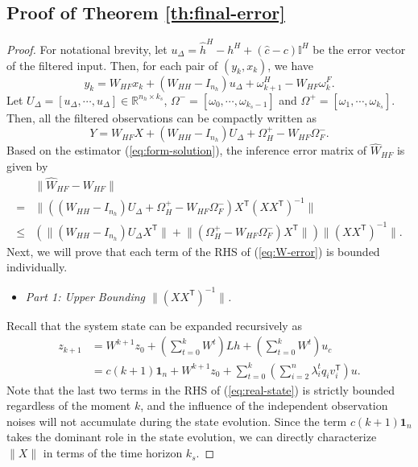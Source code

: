 \documentclass[12pt,journal,draftclsnofoot,onecolumn]{IEEEtran}
\let \sss=\scriptscriptstyle
\begin{document}
\subsection{Proof of Theorem \ref{th:final-error}}\label{apdix:final-error}
\begin{proof}
For notational brevity, let $u_{\Delta}= \hat h^{\sss H}- h^{\sss H} + (\hat c -c) \mathbb{I}^{\sss H}$ be the error vector of the filtered input. 
Then, for each pair of $(y_k,x_k)$, we have 
\begin{equation}\label{eq:y-error}
y_{k}=W_{\sss HF} x_{k}+ (W_{\sss HH} - I_{n_h}) u_{\Delta} + \omega_{k+1}^{\sss H} -W_{\sss HF} \omega_{k}^{\sss F}.  
\end{equation}
Let $U_{\Delta}=[u_{\Delta},\cdots,u_{\Delta}]\in\mathbb{R}^{n_h \times k_s}$, $\Omega^{-}=[\omega_{0},\cdots,\omega_{k_s-1}]$ and $\Omega^{+}=[\omega_{1},\cdots,\omega_{k_s}]$. 
Then, all the filtered observations can be compactly written as
\begin{equation}\label{eq:Y-error}
Y=W_{\sss HF} X+ (W_{\sss HH} - I_{n_h}) U_{\Delta} + \Omega_{\sss H}^{+} -W_{\sss HF} \Omega_{\sss F}^{-}.  
\end{equation}
Based on the estimator (\ref{eq:form-solution}), the inference error matrix of $\hat W_{\sss HF}$ is given by 
\begin{align}\label{eq:W-error}
&\| \hat W_{\sss HF} -  W_{\sss HF} \|   \nonumber  \\
=& \|((W_{\sss HH} \!-\! I_{n_h}) U_{\Delta} \!+\! \Omega_{\sss H}^{+} \!-\! W_{\sss HF} \Omega_{\sss F}^{-}) X^\mathsf{T}  (XX^\mathsf{T})^{-1} \|   \nonumber  \\
\le&  (\|(W_{\sss HH} \!-\! I_{n_h}) U_{\Delta} X^\mathsf{T} \| \! + \! \| (\Omega_{\sss H}^{+} \!-\! W_{\sss HF} \Omega_{\sss F}^{-} ) X^\mathsf{T}\| ) \| (XX^\mathsf{T})^{-1} \| .
\end{align}
Next, we will prove that each term of the RHS of (\ref{eq:W-error}) is bounded individually. 

\begin{itemize}
\item \textit{Part 1: Upper Bounding $\| (XX^\mathsf{T})^{-1} \|$. }
\end{itemize}
Recall that the system state can be expanded recursively as 
\begin{align} \label{eq:real-state}
\!\! z_{k+1}&=W^{k+1} z_{0} +  \left(\sum\nolimits_{t=0}^{k} W^{t}\right) L h + \left(\sum\nolimits_{t=0}^{k} W^{t}\right) u_{c} \nonumber \\
&= c(k+1)\bm{1}_n \!+\! W^{k+1} z_{0} + \sum\limits_{t = 0}^k (\sum\limits_{i = 2}^n {\lambda_i^t} {{q_i}{v_i^\mathsf{T}}} ) u. 
\end{align}
Note that the last two terms in the RHS of (\ref{eq:real-state}) is strictly bounded regardless of the moment $k$, and the influence of the independent observation noises will not accumulate during the state evolution. 
Since the term $c(k+1)\bm{1}_n$ takes the dominant role in the state evolution, we can directly characterize $\|X\|$ in terms of the time horizon $k_s$. 


\end{proof}
\end{document}
